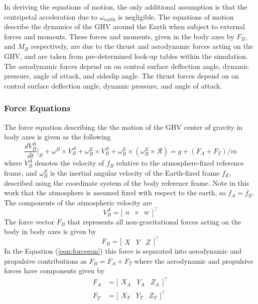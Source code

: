In deriving the equations of motion, the only additional assumption is that the centripetal acceleration due to $\omega_{\text{earth}}$ is negligible.
The equations of motion describe the dynamics of the GHV around the Earth when subject to external forces and moments.
These forces and moments, given in the body axes by $F_{B}$, and $M_{B}$ respectively, are due to the thrust and aerodynamic forces acting on the GHV, and are taken from pre-determined look-up tables within the simulation.
The aerodynamic forces depend on on control surface deflection angle, dynamic pressure, angle of attack, and sideslip angle.
The thrust forces depend on on control surface deflection angle, dynamic pressure, and angle of attack.

\subsubsection*{Force Equations}

The force equation describing the the motion of the GHV center of gravity in body axes is given as the following
\begin{equation}
  \label{eqn:forceeqn}
  \frac{dV^{A}_{B}}{dt}\biggr|_{B}+\omega^{B}\times V^{A}_{B}+
  \omega^{E}_{B}\times V^{A}_{B}+\omega^{E}_{B}\times(\omega^{E}_{B}\times\mathscr{R})=
  g+(F_{A}+F_{T})/m
\end{equation}
where $V^{A}_{B}$ denotes the velocity of $f_{B}$ relative to the atmosphere-fixed reference frame, and $\omega^{E}_{B}$ is the inertial angular velocity of the Earth-fixed frame $f_{E}$, described using the coordinate system of the body reference frame.
Note in this work that the atmosphere is assumed fixed with respect to the earth, so $f_{A}=f_{E}$.
The components of the atmospheric velocity are
\begin{equation}
  V_{B}^{A}=
  \bigr[
  \begin{array}{ccc}
    u & v & w
  \end{array}\bigr]^{\top}
\end{equation}
The force vector $F_{B}$ that represents all non-gravitational forces acting on the body in body axes is given by
\begin{equation}
  F_{B}=
  \bigr[
  \begin{array}{ccc}
    X & Y & Z
  \end{array}\bigr]^{\top}
\end{equation}
In the Equation (\ref{eqn:forceeqn}) this force is separated into aerodynamic and propulsive contributions as $F_{B}=F_{A}+F_{T}$ where the aerodynamic and propulsive forces have components given by
\begin{equation}
  \begin{split}
    F_{A}&=
    \bigr[
    \begin{array}{ccc}
      X_{A} & Y_{A} & Z_{A}
    \end{array}\bigr]^{\top} \\
    F_{T}&=
    \bigr[
    \begin{array}{ccc}
      X_{T} & Y_{T} & Z_{T}
    \end{array}\bigr]^{\top}
  \end{split}
\end{equation}

